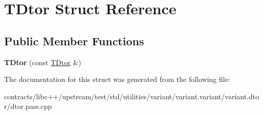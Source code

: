 \hypertarget{struct_t_dtor}{}\section{T\+Dtor Struct Reference}
\label{struct_t_dtor}
\subsection*{Public Member Functions}
\begin{DoxyCompactItemize}
\item 
\mbox{\label{struct_t_dtor_a949700f56ccd43be4d89deaafcb2d7ef}} 
{\bfseries T\+Dtor} (const \mbox{\hyperlink{struct_t_dtor}{T\+Dtor}} \&)
\end{DoxyCompactItemize}


The documentation for this struct was generated from the following file\+:\begin{DoxyCompactItemize}
\item 
contracts/libc++/upstream/test/std/utilities/variant/variant.\+variant/variant.\+dtor/dtor.\+pass.\+cpp\end{DoxyCompactItemize}
